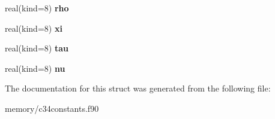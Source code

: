 \begin{DoxyCompactItemize}
\item 
\hypertarget{structc34constants_1_1carb__demand__vars_a2fbe8c308b0f1f84630d24916b5cb406}{
real(kind=8) {\bfseries rho}}
\label{structc34constants_1_1carb__demand__vars_a2fbe8c308b0f1f84630d24916b5cb406}

\item 
\hypertarget{structc34constants_1_1carb__demand__vars_afc5690ea0d855cce412210903bf987d7}{
real(kind=8) {\bfseries xi}}
\label{structc34constants_1_1carb__demand__vars_afc5690ea0d855cce412210903bf987d7}

\item 
\hypertarget{structc34constants_1_1carb__demand__vars_ae138efc2c2eea80bf2149de470db7558}{
real(kind=8) {\bfseries tau}}
\label{structc34constants_1_1carb__demand__vars_ae138efc2c2eea80bf2149de470db7558}

\item 
\hypertarget{structc34constants_1_1carb__demand__vars_a4a732886ed67f4bc1ec0f890a10da023}{
real(kind=8) {\bfseries nu}}
\label{structc34constants_1_1carb__demand__vars_a4a732886ed67f4bc1ec0f890a10da023}

\end{DoxyCompactItemize}


The documentation for this struct was generated from the following file:\begin{DoxyCompactItemize}
\item 
memory/c34constants.f90\end{DoxyCompactItemize}

